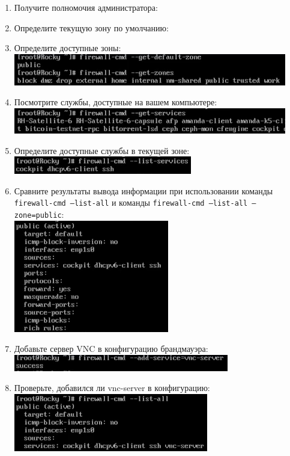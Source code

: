 \documentclass[12pt]{article}
\begin{document}
\begin{enumerate}
	\item Получите полномочия администратора:
	\item Определите текущую зону по умолчанию:
	\item Определите доступные зоны:
	      \\\includegraphics{1.png}
	\item Посмотрите службы, доступные на вашем компьютере:
	      \\\includegraphics{2.png}
	\item Определите доступные службы в текущей зоне:
	      \\\includegraphics{3.png}
	\item Сравните результаты вывода информации при использовании команды
	      \texttt{firewall-cmd --list-all}
	      и команды
	      \texttt{firewall-cmd --list-all --zone=public}:
	      \\\includegraphics{4.png}
	\item Добавьте сервер VNC в конфигурацию брандмауэра:
	      \\\includegraphics{5.png}
	\item Проверьте, добавился ли vnc-server в конфигурацию:
	      \\\includegraphics{6.png}

\end{enumerate}
\end{document}
